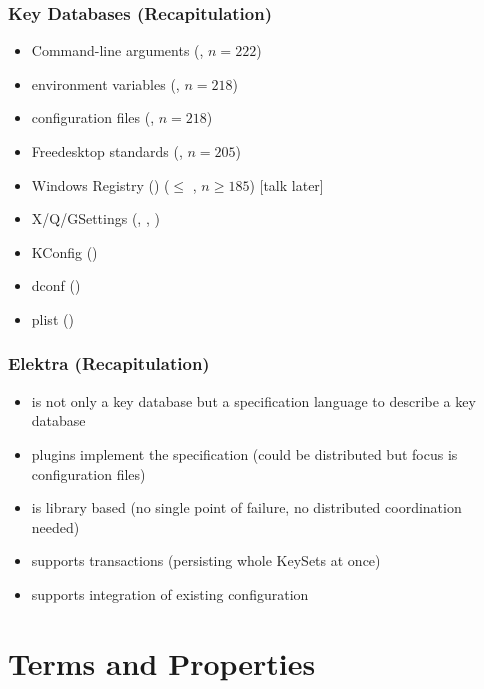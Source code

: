 \begin{frame}
	\frametitle{Key Databases (Recapitulation)}

	\pause

	\methodQuestion{} 

	\begin{itemize}
	\item Command-line arguments (, $n=222$)
	\item environment variables (, $n=218$)
	\item configuration files (, $n=218$)
	\item Freedesktop standards (, $n=205$)
	\item Windows Registry () ($\leq$ , $n\geq185$) [talk later]
	\item X/Q/GSettings (, , )
	\item KConfig ()
	\item dconf ()
	\item plist ()
	\end{itemize}

\end{frame}

\begin{frame}
	\frametitle{Elektra (Recapitulation)}

	\pause

	\begin{itemize}
	\item is not only a key database but a specification language to describe a key database
	\item plugins implement the specification (could be distributed but focus is configuration files)
	\item is library based (no single point of failure, no distributed coordination needed)
	\item supports transactions (persisting whole KeySets at once)
	\item supports integration of existing configuration
	\end{itemize}
\end{frame}

\section{Terms and Properties}

